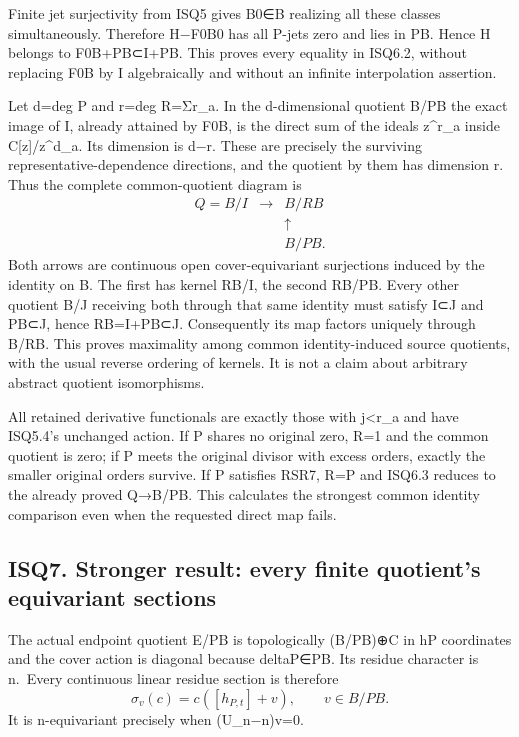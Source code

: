 \documentclass[
]{article}
\begin{document}
Finite jet surjectivity from ISQ5 gives B0∈B realizing all these classes simultaneously. Therefore H−F0B0 has all P-jets zero and lies in PB. Hence H belongs to F0B+PB⊂I+PB. This proves every equality in ISQ6.2, without replacing F0B by I algebraically and without an infinite interpolation assertion.

Let d=deg P and r=deg R=Σr\_a. In the d-dimensional quotient B/PB the exact image of I, already attained by F0B, is the direct sum of the ideals z\^{}r\_a inside C{[}z{]}/z\^{}d\_a. Its dimension is d−r. These are precisely the surviving representative-dependence directions, and the quotient by them has dimension r. Thus the complete common-quotient diagram is \[
\begin{array}{ccc}
Q=B/I&\longrightarrow&B/RB\\
&&\uparrow\\[-2pt]
&&B/PB.
\end{array}
\tag{ISQ6.3}
\] Both arrows are continuous open cover-equivariant surjections induced by the identity on B. The first has kernel RB/I, the second RB/PB. Every other quotient B/J receiving both through that same identity must satisfy I⊂J and PB⊂J, hence RB=I+PB⊂J. Consequently its map factors uniquely through B/RB. This proves maximality among common identity-induced source quotients, with the usual reverse ordering of kernels. It is not a claim about arbitrary abstract quotient isomorphisms.

All retained derivative functionals are exactly those with j\textless r\_a and have ISQ5.4's unchanged action. If P shares no original zero, R=1 and the common quotient is zero; if P meets the original divisor with excess orders, exactly the smaller original orders survive. If P satisfies RSR7, R=P and ISQ6.3 reduces to the already proved Q→B/PB. This calculates the strongest common identity comparison even when the requested direct map fails.

\subsection{ISQ7. Stronger result: every finite quotient's equivariant sections}\label{isq7.-stronger-result-every-finite-quotients-equivariant-sections}

The actual endpoint quotient E/PB is topologically (B/PB)⊕C in hP coordinates and the cover action is diagonal because deltaP∈PB. Its residue character is n.~Every continuous linear residue section is therefore \[
\sigma_v(c)=c([h_{P,t}]+v),\qquad v\in B/PB.
\tag{ISQ7.1}
\] It is n-equivariant precisely when (U\_n−n)v=0.
\end{document}
